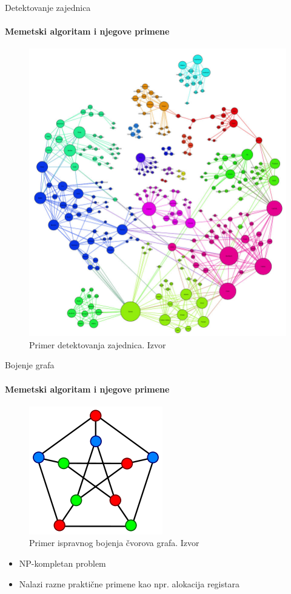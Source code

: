 \documentclass{beamer}
\begin{document}
\begin{frame}[fragile]{Detektovanje zajednica}
  \framesubtitle{Memetski algoritam i njegove primene}
  
    \begin{figure}[h!]
     	\centering
     	\includegraphics[scale=0.2]{gnn.jpg}
        \caption{Primer detektovanja zajednica. Izvor \cite{comd}}
    \end{figure}
  
\end{frame}

\begin{frame}[fragile]{Bojenje grafa}
  \framesubtitle{Memetski algoritam i njegove primene}
    \begin{figure}[h!]
     	\centering
     	\includegraphics[scale=0.5]{bojene_grafa1}
        \caption{Primer ispravnog bojenja čvorova grafa. Izvor \cite{graph_coloring}}
    \end{figure}
    
    \begin{itemize}
        \item NP-kompletan problem
        \item Nalazi razne praktične primene kao npr. alokacija registara
    \end{itemize}
\end{frame}
\end{document}

